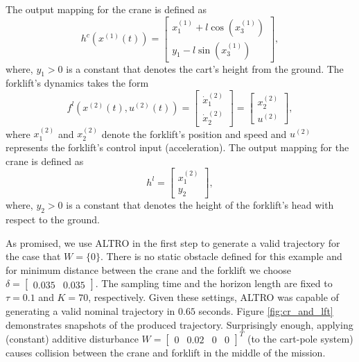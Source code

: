 The output mapping for the crane is defined as
\[
h^c(x^{(1)}(t))=\begin{bmatrix}
	x_1^{(1)}+l \cos(x_3^{(1)})\\
	y_1-l \sin(x_3^{(1)})
\end{bmatrix},
\]
where, $y_1>0$ is a constant that denotes the cart's height from the ground.
The forklift's dynamics takes the form
\[f^{l}(x^{(2)}(t),u^{(2)}(t))=\begin{bmatrix}
\dot{x}_1^{(2)}\\ \dot{x}^{(2)}_2 \end{bmatrix}=\begin{bmatrix} x^{(2)}_2\\ u^{(2)} \end{bmatrix},
\]
where $x_1^{(2)}$ and $x_2^{(2)}$ denote the forklift's position and speed and $u^{(2)}$ represents the forklift's control input (acceleration). The output mapping for the crane is defined as
\[
h^l=\begin{bmatrix}
	x_1^{(2)}\\
	y_2
\end{bmatrix},
\]
where, $y_2>0$ is a constant that denotes the height of the forklift's head with respect to the ground.

As promised, we use ALTRO in the first step to generate a valid trajectory for the case that $W=\{0\}$. There is no static obstacle defined for this example and for minimum distance between the crane and the forklift we choose $\delta=\begin{bmatrix}0.035&0.035\end{bmatrix}$. The sampling time and the horizon length are fixed to $\tau=0.1$ and $K=70$, respectively. Given these settings, ALTRO was capable of generating a valid nominal trajectory in $0.65$ seconds. Figure \ref{fig:cr_and_lft} demonstrates snapshots of the produced trajectory. Surprisingly enough, applying (constant) additive disturbance $W=\begin{bmatrix}0&0.02&0&0\end{bmatrix}^T$ (to the cart-pole system) causes collision between the crane and forklift in the middle of the mission.

